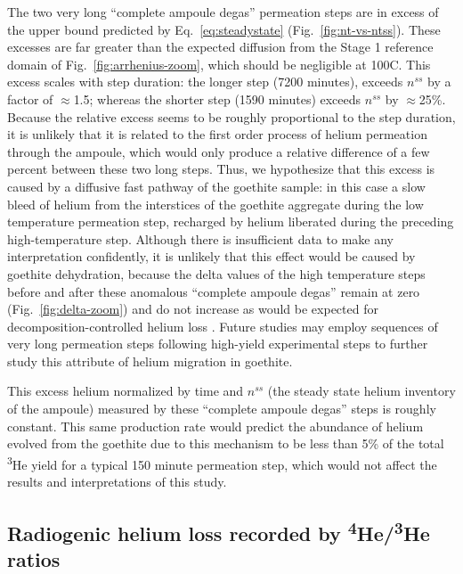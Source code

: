 The two very long ``complete ampoule degas'' permeation steps are in excess of the upper bound predicted by Eq.~\eqref{eq:steadystate} (Fig.~\ref{fig:nt-vs-ntss}). These excesses are far greater than the expected diffusion from the Stage 1 reference domain of Fig.~\ref{fig:arrhenius-zoom}, which should be negligible at 100\textdegree C. This excess scales with step duration: the longer step (7200 minutes),  exceeds $n^{ss}$ by a factor of $\approx$1.5; whereas the shorter step (1590 minutes) exceeds $n^{ss}$ by $\approx$25\%. Because the relative excess seems to be roughly proportional to the step duration, it is unlikely that it is related to the first order process of helium permeation through the ampoule, which would only produce a relative difference of a few percent between these two long steps. Thus, we hypothesize that this excess is caused by a diffusive fast pathway of the goethite sample\citep{lee1993}: in this case a slow bleed of helium from the interstices of the goethite aggregate during the low temperature permeation step, recharged by helium liberated during the preceding high-temperature step. Although there is insufficient data to make any interpretation confidently, it is unlikely that this effect would be caused by goethite dehydration, because the delta values of the high temperature steps before and after these anomalous ``complete ampoule degas'' remain at zero (Fig.~\ref{fig:delta-zoom}) and do not increase as would be expected for decomposition-controlled helium loss \citep{farley2024}. Future studies may employ sequences of very long permeation steps following high-yield experimental steps to further study this attribute of helium migration in goethite.

This excess helium normalized by time and $n^{ss}$ (the steady state helium inventory of the ampoule) measured by these ``complete ampoule degas'' steps is roughly constant. This same production rate would predict the abundance of helium evolved from the goethite due to this mechanism to be less than 5\% of the total \textsuperscript{3}He yield for a typical 150 minute permeation step, which would not affect the results and interpretations of this study.

\subsection{Radiogenic helium loss recorded by \textsuperscript{4}He/\textsuperscript{3}He ratios}\label{sec:discussion-ratios}

